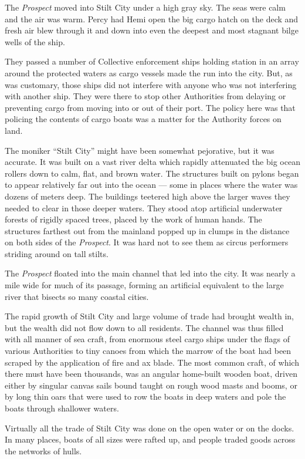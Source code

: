 \documentclass[
]{scrbook}
\begin{document}
The \emph{Prospect} moved into Stilt City under a high gray sky. The
seas were calm and the air was warm. Percy had Hemi open the big cargo
hatch on the deck and fresh air blew through it and down into even the
deepest and most stagnant bilge wells of the ship.

They passed a number of Collective enforcement ships holding station in
an array around the protected waters as cargo vessels made the run into
the city. But, as was customary, those ships did not interfere with
anyone who was not interfering with another ship. They were there to
stop other Authorities from delaying or preventing cargo from moving
into or out of their port. The policy here was that policing the
contents of cargo boats was a matter for the Authority forces on land.

The moniker ``Stilt City'' might have been somewhat pejorative, but it
was accurate. It was built on a vast river delta which rapidly
attenuated the big ocean rollers down to calm, flat, and brown water.
The structures built on pylons began to appear relatively far out into
the ocean --- some in places where the water was dozens of meters deep.
The buildings teetered high above the larger waves they needed to clear
in those deeper waters. They stood atop artificial underwater forests of
rigidly spaced trees, placed by the work of human hands. The structures
farthest out from the mainland popped up in clumps in the distance on
both sides of the \emph{Prospect}. It was hard not to see them as circus
performers striding around on tall stilts.

The \emph{Prospect} floated into the main channel that led into the
city. It was nearly a mile wide for much of its passage, forming an
artificial equivalent to the large river that bisects so many coastal
cities.

The rapid growth of Stilt City and large volume of trade had brought
wealth in, but the wealth did not flow down to all residents. The
channel was thus filled with all manner of sea craft, from enormous
steel cargo ships under the flags of various Authorities to tiny canoes
from which the marrow of the boat had been scraped by the application of
fire and ax blade. The most common craft, of which there must have been
thousands, was an angular home-built wooden boat, driven either by
singular canvas sails bound taught on rough wood masts and booms, or by
long thin oars that were used to row the boats in deep waters and pole
the boats through shallower waters.

Virtually all the trade of Stilt City was done on the open water or on
the docks. In many places, boats of all sizes were rafted up, and people
traded goods across the networks of hulls.
\end{document}
